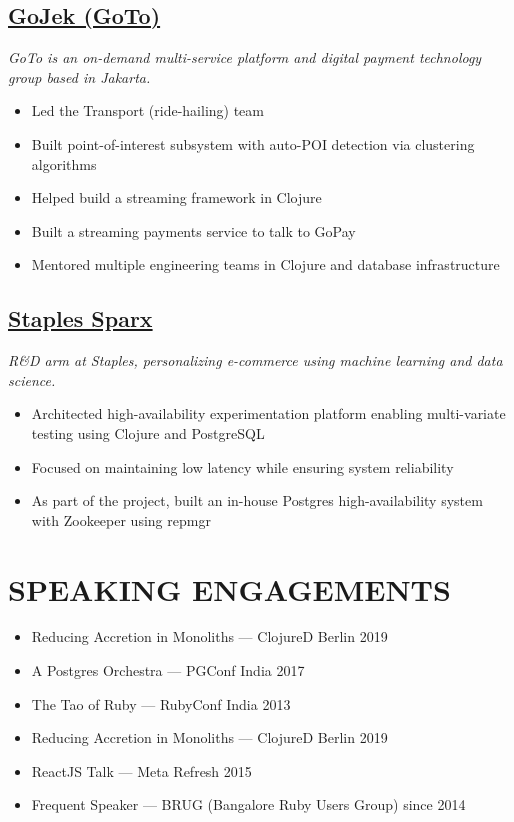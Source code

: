 \documentclass[11pt,a4paper]{article}
\begin{document}
\subsection*{\href{https://www.gojek.io}{GoJek (GoTo)}}
\textit{GoTo is an on-demand multi-service platform and digital payment technology group based in Jakarta.}
\begin{itemize}
  \item Led the Transport (ride-hailing) team
  \item Built point-of-interest subsystem with auto-POI detection via clustering algorithms
  \item Helped build a streaming framework in Clojure
  \item Built a streaming payments service to talk to GoPay
  \item Mentored multiple engineering teams in Clojure and database infrastructure
\end{itemize}

\subsection*{\href{https://www.staples.com/}{Staples Sparx}}
\textit{R\&D arm at Staples, personalizing e-commerce using machine learning and data science.}
\begin{itemize}
    \item Architected high-availability experimentation platform enabling multi-variate testing using Clojure and PostgreSQL
    \item Focused on maintaining low latency while ensuring system reliability
    \item As part of the project, built an in-house Postgres high-availability system with Zookeeper  using repmgr
\end{itemize}

\section*{SPEAKING ENGAGEMENTS}
\begin{itemize}
    \item Reducing Accretion in Monoliths — ClojureD Berlin 2019
    \item A Postgres Orchestra — PGConf India 2017
    \item The Tao of Ruby — RubyConf India 2013
    \item Reducing Accretion in Monoliths — ClojureD Berlin 2019
    \item ReactJS Talk — Meta Refresh 2015
    \item Frequent Speaker — BRUG (Bangalore Ruby Users Group) since 2014
\end{itemize}
\end{document}
